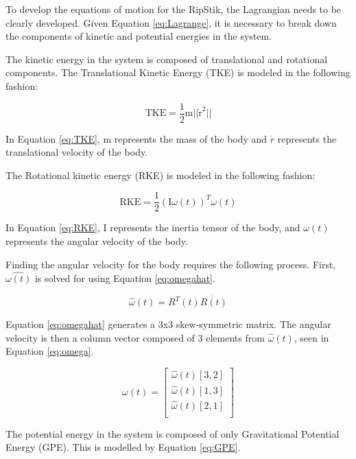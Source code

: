 To develop the equations of motion for the RipStik, the Lagrangian needs to be clearly developed. Given Equation \ref{eq:Lagrange}, it is necessary to break down the components of kinetic and potential energies in the system.

The kinetic energy in the system is composed of translational and rotational components.
The Translational Kinetic Energy (TKE) is modeled in the following fashion:

\begin{equation}
\label{eq:TKE}
\text{TKE} = \frac{1}{2}{\text{m}}{\lvert \lvert {\dot{\text{r}}^2} \rvert \rvert}
\end{equation}

In Equation \ref{eq:TKE}, m represents the mass of the body and $\dot{r}$ represents the translational velocity of the body.
\par
The Rotational kinetic energy (RKE) is modeled in the following fashion:

\begin{equation}
\label{eq:RKE}
\text{RKE} = \frac{1}{2}({\text{I}}{\omega(t)})^T\omega(t)
\end{equation}

In Equation \ref{eq:RKE}, I represents the inertia tensor of the body, and $\omega(t)$ represents the angular velocity of the body.

Finding the angular velocity for the body requires the following process. First, $\hat{\omega(t)}$ is solved for using Equation \ref{eq:omegahat}.

\begin{equation}
\label{eq:omegahat}
\hat{\omega}(t)=R^T(t)\dot{R(t)}
\end{equation}

Equation \ref{eq:omegahat} generates a 3x3 skew-symmetric matrix. The angular velocity is then a column vector composed of 3 elements from $\hat{\omega}(t)$, seen in Equation \ref{eq:omega}.

\begin{equation}
\label{eq:omega}
\omega(t)=\begin{bmatrix}
\hat{\omega}(t)[3,2] \\
\hat{\omega}(t)[1,3] \\
\hat{\omega}(t)[2,1]\\
\end{bmatrix}
\end{equation}

The potential energy in the system is composed of only Gravitational Potential Energy (GPE). This is modelled by Equation \ref{eq:GPE}.

